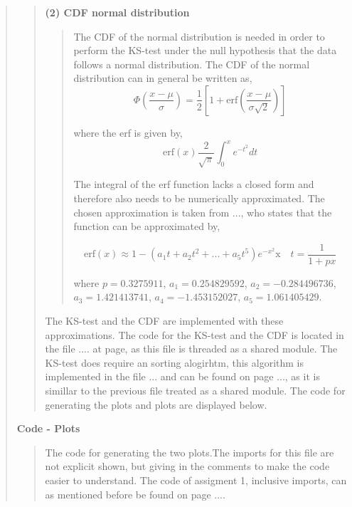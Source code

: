 \begin{quote}
\begin{quote}
\textbf{(2) CDF normal distribution}
\begin{quote}
The CDF of the normal distribution is needed in order to perform the KS-test under the null hypothesis that the data follows a normal distribution. The CDF of the normal distribution can in general be written as,
\begin{equation}
\Phi\left( \frac{x- \mu}{\sigma}\right) = \frac{1}{2} \left[ 1 + \text{erf} \left( \frac{x - \mu}{\sigma\sqrt{2}} \right) \right]
\end{equation}

where the erf is given by,
\begin{equation}
\text{erf}(x)  \frac{2}{\sqrt{\pi}} \int_0^{x} e^{-t^2} dt
\end{equation}

The integral of the erf function lacks a closed form and therefore also needs to be numerically approximated. The chosen approximation is taken from ..., who states that the function can be 
approximated by,

\begin{equation}
\text{erf}(x) \approx 1- (a_1t+a_2t^2 + ... + a_5t^5)e^{-x^2} \text{x} \quad t = \frac{1}{1+px}
\end{equation}

where $p  =0.3275911$, $a_1 =  0.254829592$, $a_2 = -0.284496736$, $a_3 = 1.421413741$, $a_4 =  -1.453152027$, $a_5 = 1.061405429$.
\end{quote}

The KS-test and the CDF are implemented with these approximations. The code for the KS-test and the CDF  is located in the file .... at page, as this file is threaded as a shared module. The KS-test does require an sorting alogirhtm, this algorithm is implemented in the file ... and can be found on page ..., as it is simillar to the previous file treated as a shared module.
 The code for generating the plots and plots are displayed below.  
\end{quote}

\newpage
\textbf{Code - Plots}

\begin{quote}
The code for generating the two plots.The imports for this file are not explicit shown, but giving in the comments to make the code easier to understand. The code of assigment 1, inclusive imports, can as mentioned before be found on page ....

\end{quote}
\newpage


\end{quote}
